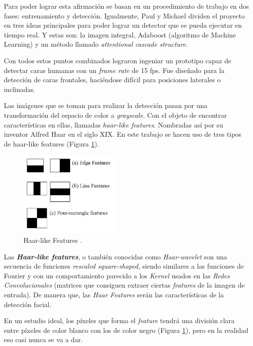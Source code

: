 Para poder lograr esta afirmación se basan en un procedimiento de trabajo en dos fases: entrenamiento y detección. Igualmente, Paul y Michael dividen el proyecto en tres ideas principales para poder lograr un detector que se pueda ejecutar en tiempo real. Y estas son: la imagen integral, Adaboost (algoritmo de Machine Learning) y un método llamado \textit{attentional cascade structure}. 

Con todos estos puntos combinados lograron ingeniar un prototipo capaz de detectar caras humanas con un \textit{frame rate} de 15 fps. Fue diseñado para la detección de caras frontales, haciéndose difícil para posiciones laterales o inclinadas.

Las imágenes que se toman para realizar la detección pasan por una transformación del espacio de color a \textit{grayscale}. Con el objeto de encontrar características en ellas, llamadas \textit{haar-like features}. Nombradas así por su inventor Alfred Haar en el siglo XIX. En este trabajo se hacen uso de tres tipos de haar-like features (Figura \ref{fig:haarLike}).

\begin{figure}[htp]
	\centering
	\includegraphics[width=5cm]{imagenes/haar-like.jpeg}
	\caption[Haar-like Features.]{Haar-like Features \cite{haar-like}.}
	\label{fig:haarLike}
\end{figure}
\vspace{-0.3cm}
Las \textbf{\textit{Haar-like features}}, o también conocidas como \textit{Haar-wavelet} son una secuencia de funciones \textit{rescaled square-shaped}, siendo similares a las funciones de Fourier y con un comportamiento parecido a los \textit{Kernel} usados en las \textit{Redes Convolucionales} (matrices que consiguen extraer ciertas \textit{features} de la imagen de entrada). De manera que, las \textit{Haar Features} serán las características de la detección facial.

En un estudio ideal, los píxeles que forma el \textit{feature} tendrá una división clara entre píxeles de color blanco con los de color negro (Figura \ref{fig:haarLike}), pero en la realidad eso casi nunca se va a dar.

